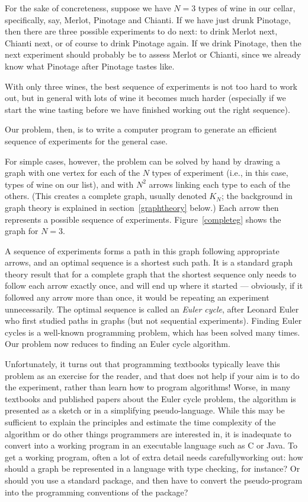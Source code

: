 \documentclass[12pt]{article}
\begin{document}
For the sake of concreteness, suppose we have $N=3$ types of wine in our cellar, specifically, say, Merlot, Pinotage and Chianti. If we have just drunk Pinotage, then there are three possible experiments to do next: to drink Merlot next, Chianti next, or of course to drink Pinotage again. If we drink Pinotage, then the next experiment should probably be to assess Merlot or Chianti, since we already know what Pinotage after Pinotage tastes like. 

With only three wines, the best sequence of experiments is not too hard to work out, but in general with lots of wine it becomes much harder (especially if we start the wine tasting before we have finished working out the right sequence).

Our problem, then, is to write a computer program to generate an efficient sequence of experiments for the general case. 

For simple cases, however, the problem can be solved by hand by drawing a graph with one vertex for each of the $N$ types of experiment (i.e., in this case, types of wine on our list), and with $N^2$ arrows linking each type to each of the others. (This creates a complete graph, usually denoted $K_N$; the background in graph theory is explained in section~\ref{graphtheory} below.) Each arrow then represents a possible sequence of experiments. Figure~\ref{completeg} shows the graph for $N=3$. 

A sequence of experiments forms a path in this graph following appropriate arrows, and an optimal sequence is a shortest such path. It is a standard graph theory result that for a complete graph that the shortest sequence only needs to follow each arrow exactly once, and will end up where it started --- obviously, if it followed any arrow more than once, it would be repeating an experiment unnecessarily. The optimal sequence is called an \emph{Euler cycle}, after Leonard Euler who first studied paths in graphs (but not sequential experiments). Finding Euler cycles is a well-known programming problem, which has been solved many times. Our problem now reduces to finding an Euler cycle algorithm.

Unfortunately, it turns out that programming textbooks typically leave this problem as an exercise for the reader, and that does not help if your aim is to do the experiment, rather than learn how to program algorithms! Worse, in many textbooks and published papers about the Euler cycle problem, the algorithm is presented as a sketch or in a simplifying pseudo-language. While this may be sufficient to explain the principles and estimate the time complexity of the algorithm or do other things programmers are interested in, it is inadequate to convert into a working program in an executable language such as C or Java. To get a working program, often a lot of extra detail needs carefullyworking out: how should a graph be represented in a language with type checking, for instance? Or should you use a standard package, and then have to convert the pseudo-program into the programming conventions of the package?
\end{document}
